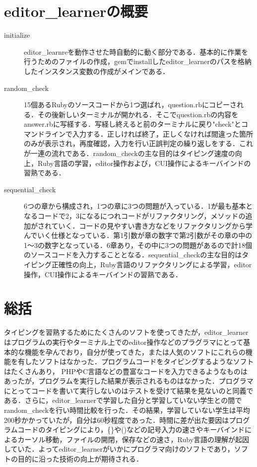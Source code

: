 \documentclass[a4j,twocolumn]{jsarticle}
\begin{document}
\section{editor\_learnerの概要}
\begin{description}
\item[initialize]
editor\_learnreを動作させた時自動的に動く部分である．基本的に作業を行うためのファイルの作成，gemでinstallしたeditor\_learnerのパスを格納したインスタンス変数の作成がメインである．
\item[random\_check] 
15個あるRubyのソースコードから1つ選ばれ，question.rbにコピーされる．その後新しいターミナルが開かれる．そこでquestion.rbの内容をanswer.rbに写経する．写経し終えると前のターミナルに戻り"check"とコマンドラインで入力する．正しければ終了，正しくなければ間違った箇所のみが表示され，再度確認，入力を行い正誤判定の繰り返しをする．これが一連の流れである．random\_checkの主な目的はタイピング速度の向上，Ruby言語の学習，editor操作および，CUI操作によるキーバインドの習熟である．
\item[sequential\_check]
6つの章から構成され，1つの章に3つの問題が入っている．1が最も基本となるコードで2，3になるにつれコードがリファクタリング，メソッドの追加がされていく．コードの見やすい書き方などをリファクタリングから学んでいく仕様となっている．第1引数が章の数字で第2引数がその章の中の1〜3の数字となっている．6章あり，その中に3つの問題があるので計18個のソースコードを入力することとなる．sequential\_checkの主な目的はタイピング正確性の向上，Ruby言語のリファクタリングによる学習，editor操作，CUI操作によるキーバインドの習熟である．
\end{description}

\section{総括}
タイピングを習熟するためにたくさんのソフトを使ってきたが，editor\_learnerはプログラムの実行やターミナル上でのeditor操作などのプラグラマにとって基本的な機能を孕んでおり，自分が使ってきた，または人気のソフトにこれらの機能を有したソフトはなかった．プログラムコードをタイピングするようなソフトはたくさんあり， PHPやC言語などの豊富なコードを入力できるようなものはあったが，プログラムを実行した結果が表示されるものはなかった．プログラマにとってコードを書いて実行しないのはテストを受けて結果を見ないのと同義である．さらに，editor\_learnerで学習した自分と学習していない学生との間でrandom\_checkを行い時間比較を行った．その結果，学習していない学生は平均200秒かかっていたが，自分は60秒程度であった．時間に差が出た要因はプログラムコードのタイピングにより，\{\}や()などの記号入力の速さやキーバインドによるカーソル移動，ファイルの開閉，保存などの速さ，Ruby言語の理解が起因していた．よってeditor\_learnerがいかにプログラマ向けのソフトであり，ソフトの目的に沿った技術の向上が期待される．
\end{document}
